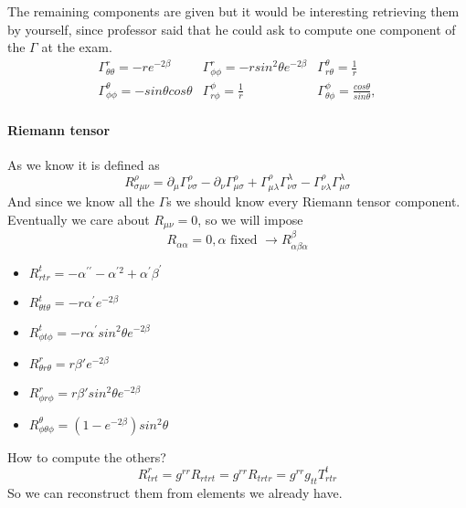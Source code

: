 The remaining components are given but it would be interesting retrieving them by yourself, since professor said that he could ask to compute one component of the $\Gamma $ at the exam.
\begin{equation}
\begin{matrix}
\Gamma ^{r}_{\theta \theta } = - r e^{-2\beta } & \Gamma ^{r}_{\phi \phi } = -r sin^{2}\theta e^{-2\beta } & \Gamma^{\theta }_{r\theta } = \frac{1}{r} \\
\Gamma ^{\theta }_{\phi \phi } = -sin \theta cos \theta  & \Gamma ^{\phi }_{r\phi } = \frac{1}{r} & \Gamma ^{\phi }_{\theta \phi } = \frac{cos \theta }{sin \theta } ,
\end{matrix} 
\end{equation}

\paragraph{Riemann tensor}
As we know it is defined as
\[
R^{\rho }_{\sigma \mu \nu } = \partial_{\mu }\Gamma ^{\rho }_{\nu \sigma }- \partial_{\nu }\Gamma ^{\rho }_{\mu \sigma } + \Gamma ^{\rho }_{\mu \lambda }\Gamma ^{\lambda }_{\nu \sigma }- \Gamma ^{\rho }_{\nu \lambda }\Gamma ^{\lambda }_{\mu \sigma }
\]
And since we know all the $\Gamma$s we should know every Riemann tensor component. Eventually we care about $R_{\mu \nu } = 0$, so we will impose
\[
R_{\alpha \alpha } = 0, \alpha \text{ fixed } \to R^{\beta }_{\alpha \beta \alpha }
\]
\begin{itemize}
\item $R^{t}_{rtr} = -\alpha^{\prime \prime } -\alpha ^{\prime 2} +\alpha^{\prime }\beta ^{\prime }$
\item $R^{t}_{\theta  t \theta } = -r \alpha^{\prime } e^{-2\beta }$
\item $R^{t}_{\phi t \phi } = -r \alpha^{\prime } sin^{2} \theta  e^{-2\beta }$
\item $R^{r}_{\theta r \theta } = r\beta ' e^{-2\beta }$
\item $R^{r}_{\phi r \phi } = r \beta ' sin^{2}\theta  e^{-2\beta }$
\item $R^{\theta }_{\phi \theta \phi } = \left( 1-e^{-2\beta } \right)sin^{2} \theta $
\end{itemize}
How to compute the others?
\begin{equation}
R^{r}_{trt} = g^{rr}R_{rtrt} = g^{rr}R_{trtr} = g^{rr}g_{tt}T^{t}_{rtr}
\end{equation}
So we can reconstruct them from elements we already have.

